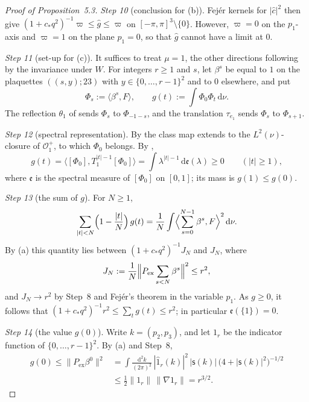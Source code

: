 \documentclass[11pt]{amsart}
\theoremstyle{definition}
\begin{document}
\begin{proof}[Proof of Proposition~5.3]
\emph{Step 10} (conclusion for (b)).
Fej\'er kernels for $|\hat c|^2$ then give $(1+c_*q^2)^{-1}\varpi\le\hat g\le\varpi$ on $[-\pi,\pi]^3\setminus\{0\}$.
However, $\varpi=0$ on the $p_1$-axis and $\varpi=1$ on the plane $p_1=0$, so that $\hat g$ cannot have a limit at $0$.

\emph{Step 11} (set-up for (c)).
It suffices to treat $\mu=1$, the other directions following by the invariance under $W$.
For integers $r\ge1$ and $s$, let $\beta^s$ be equal to $1$ on the plaquettes $((s,y);23)$ with $y\in\{0,\dots,r-1\}^2$ and to $0$ elsewhere, and put
\begin{equation*}
\Phi_s:=\langle\beta^s,F\rangle,\qquad g(t):=\int\Phi_0\Phi_t\,\mathrm d\nu.
\end{equation*}
The reflection $\theta_1$ of \cite[Definition~10.11]{QEDII} sends $\Phi_s$ to $\Phi_{-1-s}$, and the translation $\tau_{e_1}$ sends $\Phi_s$ to $\Phi_{s+1}$.

\emph{Step 12} (spectral representation).
By \cite[Lemma~10.9\,(a)]{QEDII} the class map extends to the $L^2(\nu)$-closure of $\mathcal O^+_1$, to which $\Phi_0$ belongs.
By \cite[Lemma~10.9\,(b), (d)]{QEDII},
\begin{equation*}
g(t)=\bigl\langle[\Phi_0],T_1^{|t|-1}[\Phi_0]\bigr\rangle=\int\lambda^{|t|-1}\,\mathrm d\mathfrak e(\lambda)\ge0\qquad(|t|\ge1),
\end{equation*}
where $\mathfrak e$ is the spectral measure of $[\Phi_0]$ on $[0,1]$; its mass is $g(1)\le g(0)$.

\emph{Step 13} (the sum of $g$).
For $N\ge1$,
\begin{equation*}
\sum_{|t|<N}\Bigl(1-\frac{|t|}{N}\Bigr)\,g(t)=\frac1N\int\Bigl\langle\sum_{s=0}^{N-1}\beta^s,F\Bigr\rangle^2\,\mathrm d\nu.
\end{equation*}
By (a) this quantity lies between $(1+c_*q^2)^{-1}J_N$ and $J_N$, where
\begin{equation*}
J_N:=\frac1N\Bigl\|P_{\mathrm{ex}}\sum_{s<N}\beta^s\Bigr\|^2\le r^2,
\end{equation*}
and $J_N\to r^2$ by Step~8 and Fej\'er's theorem in the variable $p_1$.
As $g\ge0$, it follows that $(1+c_*q^2)^{-1}r^2\le\sum_tg(t)\le r^2$; in particular $\mathfrak e(\{1\})=0$.

\emph{Step 14} (the value $g(0)$).
Write $k=(p_2,p_3)$, and let $1_r$ be the indicator function of $\{0,\dots,r-1\}^2$.
By (a) and Step~8,
\begin{align*}
g(0)\le\|P_{\mathrm{ex}}\beta^0\|^2
&=\int\frac{\mathrm d^2k}{(2\pi)^2}\,|\hat{1}_r(k)|^2\,|\mathsf s(k)|\,\bigl(4+|\mathsf s(k)|^2\bigr)^{-1/2}\\
&\le\frac12\|1_r\|\,\|\nabla 1_r\|=r^{3/2}.
\end{align*}


\end{proof}
\end{document}
